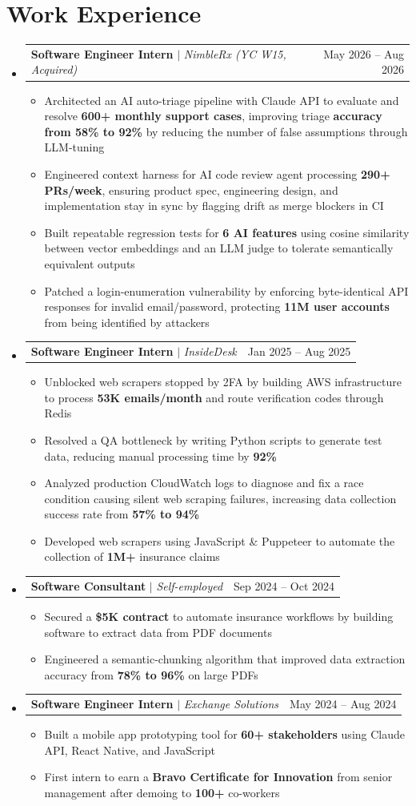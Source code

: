 \documentclass[letterpaper,11pt]{article}
\makeatletter
\newcommand{\resumeItem}[1]{
  \item\small{
    \setlength{\baselineskip}{0.0pt}
    {#1\par\vspace{0.5pt}}
  }
}
\newcommand{\resumeSubheadingB}[3]{
  \vspace{0pt}\item
    \begin{tabular*}{0.97\textwidth}[t]{l@{\extracolsep{\fill}}r}
      \textbf{#1} $|$ \textit{#3} & #2 \\
    \end{tabular*}\vspace{-7pt}
}
\newcommand{\resumeSubHeadingListStart}{\begin{itemize}[leftmargin=0.15in, label={}]}
\newcommand{\resumeSubHeadingListEnd}{\end{itemize}}
\newcommand{\resumeItemListStart}{\begin{itemize}}
\newcommand{\resumeItemListEnd}{\end{itemize}\vspace{-7pt}}
\makeatother
\begin{document}
\section{Work Experience}
  \resumeSubHeadingListStart
    \resumeSubheadingB{Software Engineer Intern}{May 2026 -- Aug 2026}{NimbleRx (YC W15, Acquired)}
      \resumeItemListStart
        \resumeItem{Architected an AI auto-triage pipeline with Claude API to evaluate and resolve \textbf{600+ monthly support cases}, improving triage \textbf{accuracy from 58\% to 92\%} by reducing the number of false assumptions through LLM-tuning}
        \resumeItem{Engineered context harness for AI code review agent processing \textbf{290+ PRs/week}, ensuring product spec, engineering design, and implementation stay in sync by flagging drift as merge blockers in CI}
        \resumeItem{Built repeatable regression tests for \textbf{6 AI features} using cosine similarity between vector embeddings and an LLM judge to tolerate semantically equivalent outputs}
        \resumeItem{Patched a login-enumeration vulnerability by enforcing byte-identical API responses for invalid email/password, protecting \textbf{11M user accounts} from being identified by attackers}
      \resumeItemListEnd
    \resumeSubheadingB{Software Engineer Intern}{Jan 2025 -- Aug 2025}{InsideDesk}
      \resumeItemListStart
        \resumeItem{Unblocked web scrapers stopped by 2FA by building AWS infrastructure to process \textbf{53K emails/month} and route verification codes through Redis}
        \resumeItem{Resolved a QA bottleneck by writing Python scripts to generate test data, reducing manual processing time by \textbf{92\%}}
        \resumeItem{Analyzed production CloudWatch logs to diagnose and fix a race condition causing silent web scraping failures, increasing data collection success rate from \textbf{57\% to 94\%}}
        \resumeItem{Developed web scrapers using JavaScript \& Puppeteer to automate the collection of \textbf{1M+} insurance claims}
      \resumeItemListEnd
    \resumeSubheadingB{Software Consultant}{Sep 2024 -- Oct 2024}{Self-employed}
      \resumeItemListStart
        \resumeItem{Secured a \textbf{\$5K contract} to automate insurance workflows by building software to extract data from PDF documents}
        \resumeItem{Engineered a semantic-chunking algorithm that improved data extraction accuracy from \textbf{78\% to 96\%} on large PDFs}
      \resumeItemListEnd
    \resumeSubheadingB{Software Engineer Intern}{May 2024 -- Aug 2024}{Exchange Solutions}
      \resumeItemListStart
        \resumeItem{Built a mobile app prototyping tool for \textbf{60+ stakeholders} using Claude API, React Native, and JavaScript}
        \resumeItem{First intern to earn a \textbf{Bravo Certificate for Innovation} from senior management after demoing to \textbf{100+} co-workers}
      \resumeItemListEnd
  \resumeSubHeadingListEnd
\end{document}

